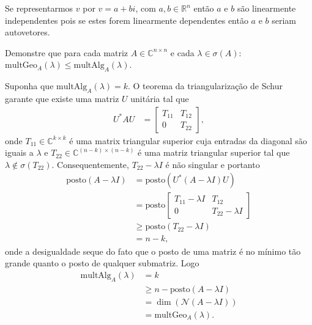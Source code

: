 \documentclass[a4paper,12pt, leqno, answers]{exam}
\begin{document}
\begin{questions}
\begin{parts}
\begin{solution}
            Se representarmos $v$ por $v = a + b i$, com $a, b \in \mathbb{R}^n$ ent\~{a}o $a$ e $b$ s\~{a}o linearmente independentes pois se estes forem linearmente dependentes ent\~{a}o $a$ e $b$ seriam autovetores.
        \end{solution}
    \end{parts}

     Demonstre que para cada matriz $A \in \mathbb{C}^{n \times n}$ e cada $\lambda \in \sigma(A)$: $\mathrm{multGeo}_A(\lambda) \leq \mathrm{multAlg}_A(\lambda)$.
    \begin{solution}
        Suponha que $\mathrm{multAlg}_A(\lambda) = k$. O teorema da triangulariza\c{c}\~{a}o de Schur garante que existe uma matriz $U$ unit\'{a}ria tal que
        \begin{align*}
            U^* A U &= \begin{bmatrix}
                T_{11} & T_{12} \\
                0 & T_{22}
            \end{bmatrix},
        \end{align*}
        onde $T_{11} \in \mathbb{C}^{k \times k}$ \'{e} uma matrix triangular superior cuja entradas da diagonal s\~{a}o iguais a $\lambda$ e $T_{22} \in \mathbb{C}^{(n - k) \times (n - k)}$ \'{e} uma matriz triangular superior tal que $\lambda \not\in \sigma(T_{22})$. Consequentemente, $T_{22} - \lambda I$ \'{e} n\~{a}o singular e portanto
        \begin{align*}
            \mathrm{posto}(A - \lambda I) &= \mathrm{posto}\left( U^* (A - \lambda I) U \right) \\
            &= \mathrm{posto}\begin{bmatrix}
                T_{11} - \lambda I & T_{12} \\
                0 & T_{22} - \lambda I
            \end{bmatrix} \\
            &\geq \mathrm{posto}(T_{22} - \lambda I) \\
            &= n - k,
        \end{align*}
        onde a desigualdade seque do fato que o posto de uma matriz \'{e} no m\'{i}nimo t\~{a}o grande quanto o posto de qualquer submatriz. Logo
        \begin{align*}
            \mathrm{multAlg}_A(\lambda) &= k \\
            &\geq n - \mathrm{posto}(A - \lambda I) \\
            &= \dim(\mathcal{N}(A - \lambda I)) \\
            &= \mathrm{multGeo}_A(\lambda).
        \end{align*}
    \end{solution}


\end{questions}
\end{document}

